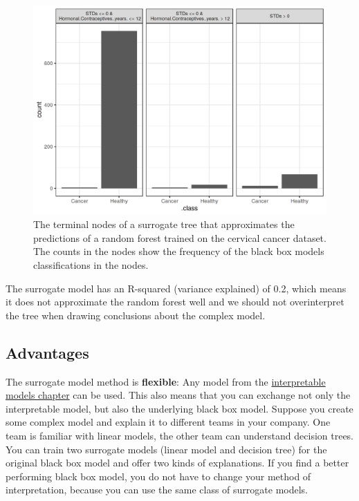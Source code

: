 \documentclass[12pt,]{krantz}
\begin{document}
\begin{figure}

{\centering \includegraphics[width=\textwidth]{images/surrogate-cervical-1} 

}

\caption{The terminal nodes of a surrogate tree that approximates the predictions of a random forest trained on the cervical cancer dataset. The counts in the nodes show the frequency of the black box models classifications in the nodes.}\label{fig:surrogate-cervical}
\end{figure}

The surrogate model has an R-squared (variance explained) of 0.2, which
means it does not approximate the random forest well and we should not
overinterpret the tree when drawing conclusions about the complex model.

\subsection{Advantages}\label{advantages-10}

The surrogate model method is \textbf{flexible}: Any model from the
\protect\hyperlink{simple}{interpretable models chapter} can be used.
This also means that you can exchange not only the interpretable model,
but also the underlying black box model. Suppose you create some complex
model and explain it to different teams in your company. One team is
familiar with linear models, the other team can understand decision
trees. You can train two surrogate models (linear model and decision
tree) for the original black box model and offer two kinds of
explanations. If you find a better performing black box model, you do
not have to change your method of interpretation, because you can use
the same class of surrogate models.
\end{document}
